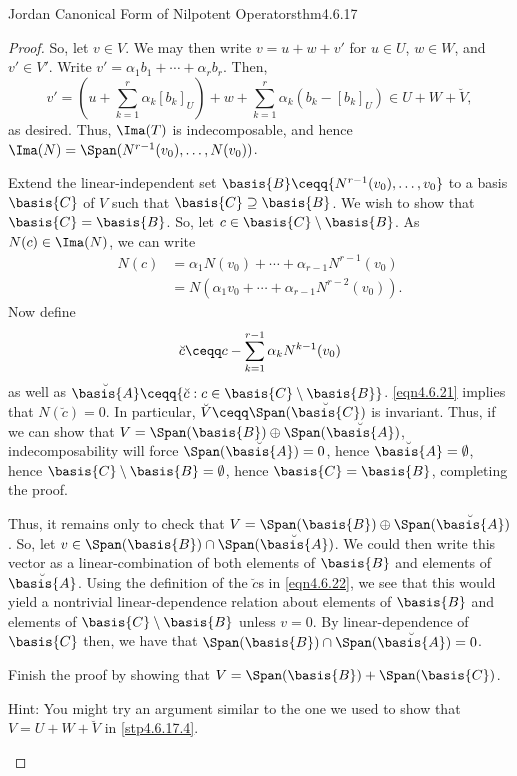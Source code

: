 \begin{thm}{Jordan Canonical Form of Nilpotent Operators}{thm4.6.17}
\begin{proof}
		So, let $v\in V$.  We may then write $v=u+w+v'$ for $u\in U$, $w\in W$, and $v'\in V'$.  Write $v'=\alpha _1b_1+\cdots +\alpha _rb_r$.  Then,
		\begin{equation}
		v'=\left( u+\sum _{k=1}^r\alpha _k[b_k]_U\right) +w+\sum _{k=1}^r\alpha _k(b_k-[b_k]_U)\in U+W+\breve{V},
		\end{equation}
		as desired.  Thus, $\Ima (T)$ is indecomposable, and hence $\Ima (N)=\Span (N^{r-1}(v_0),\ldots ,N(v_0))$.
		
		Extend the linear-independent set $\basis{B}\ceqq \{ N^{r-1}(v_0),\ldots ,v_0\}$ to a basis $\basis{C}$ of $V$ such that $\basis{C}\supseteq \basis{B}$.  We wish to show that $\basis{C}=\basis{B}$.  So, let $c\in \basis{C}\setminus \basis{B}$.  As $N(c)\in \Ima (N)$, we can write
		\begin{equation}\label{eqn4.6.21}
		\begin{split}
		N(c)& =\alpha _1N(v_0)+\cdots +\alpha _{r-1}N^{r-1}(v_0) \\
		& =N\left( \alpha _1v_0+\cdots +\alpha _{r-1}N^{r-2}(v_0)\right) .
		\end{split}
		\end{equation}
		Now define
		\begin{equation}\label{eqn4.6.22}
		\breve{c}\ceqq c-\sum _{k=1}^{r-1}\alpha _kN^{k-1}(v_0)
		\end{equation}
		as well as $\breve{\basis{A}}\ceqq \{ \breve{c}:c\in \basis{C}\setminus \basis{B}\}$.  \eqref{eqn4.6.21} implies that $N(\breve{c})=0$.  In particular, $\breve{V}\ceqq \Span (\breve{\basis{C}})$ is invariant.  Thus, if we can show that $V=\Span (\basis{B})\oplus \Span (\breve{\basis{A}})$, indecomposability will force $\Span (\breve{\basis{A}})=0$, hence $\breve{\basis{A}}=\emptyset$, hence $\basis{C}\setminus \basis{B}=\emptyset$, hence $\basis{C}=\basis{B}$, completing the proof.
		
		Thus, it remains only to check that $V=\Span (\basis{B})\oplus \Span (\breve{\basis{A}})$.  So, let $v\in \Span (\basis{B})\cap \Span (\breve{\basis{A}})$.  We could then write this vector as a linear-combination of both elements of $\basis{B}$ and elements of $\breve{\basis{A}}$.  Using the definition of the $\breve{c}$s in \eqref{eqn4.6.22}, we see that this would yield a nontrivial linear-dependence relation about elements of $\basis{B}$ and elements of $\basis{C}\setminus \basis{B}$ unless $v=0$.  By linear-dependence of $\basis{C}$ then, we have that $\Span (\basis{B})\cap \Span (\breve{\basis{A}})=0$.
		\begin{exr}[breakable=false]{}{}
			Finish the proof by showing that $V=\Span (\basis{B})+\Span (\basis{C})$.
			\begin{rmk}
				Hint:  You might try an argument similar to the one we used to show that $V=U+W+\breve{V}$ in \cref{stp4.6.17.4}.
			\end{rmk}
		\end{exr}
		

\end{proof}
\end{thm}
